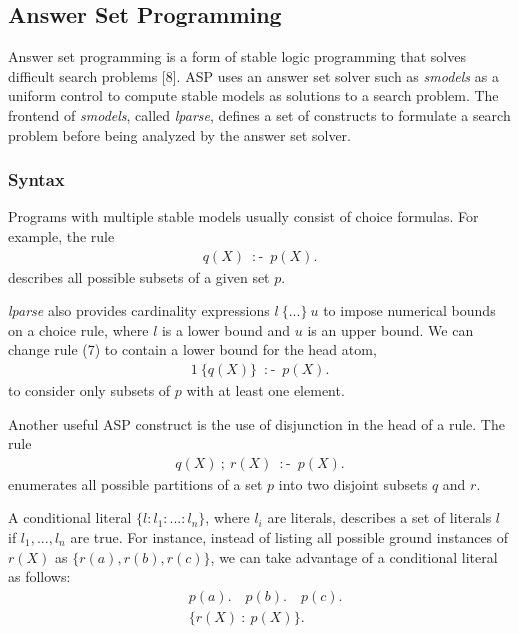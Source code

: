 \subsection{Answer Set Programming}
Answer set programming is a form of stable logic programming that solves difficult 
search problems [8]. ASP uses an answer set solver such as \textit{smodels} as a uniform control 
to compute stable models as solutions to a search problem. The frontend of \textit{smodels}, 
called \textit{lparse}, defines a set of constructs to formulate a search problem before 
being analyzed by the answer set solver. 

\subsubsection{Syntax}
Programs 
with multiple stable models usually consist of choice formulas. For example, the rule 
\begin{align}
    {q(X)} \: \mathop{:\!\!-} \: p(X).
\end{align}
describes all possible subsets of a given set $p$. 

\textit{lparse} also provides cardinality expressions $l \: \{...\} \: u$ to impose numerical 
bounds on a choice rule, where $l$ is a lower bound and $u$ is an upper bound. We can change 
rule (7) to contain a lower bound for the head atom, 
\begin{align*}
    1 \: \{q(X)\} \: \mathop{:\!\!-} \: p(X).
\end{align*}
to consider only subsets of $p$ with at least one element. 

Another useful ASP construct is the use of disjunction in the head of a rule. The 
rule 
\begin{align*}
    q(X) \: ; \: r(X) \: \mathop{:\!\!-} \: p(X).
\end{align*}
enumerates all possible partitions of a set $p$ into two disjoint subsets $q$ and $r$. 

A conditional literal $\{l:l_1:...:l_n\}$, where $l_i$ are literals, describes a set of 
literals $l$ if $l_1,...,l_n$ are true. For instance, instead of listing all possible 
ground instances of $r(X)$ as $\{r(a),r(b),r(c)\}$, we can take advantage of a conditional 
literal as follows:
\begin{align*}
    &p(a). \hspace{1em} p(b). \hspace{1em} p(c). \\
    &\{r(X) \: : \: p(X)\}.
\end{align*}

